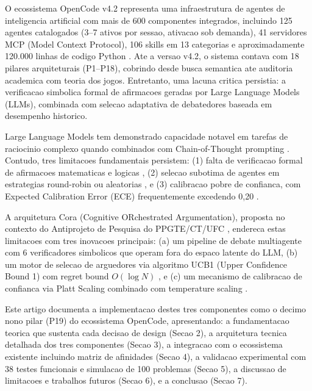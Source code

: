\documentclass[5p]{elsarticle}
\begin{document}
O ecossistema OpenCode v4.2 representa uma infraestrutura de agentes de inteligencia artificial com mais de 600 componentes integrados, incluindo 125 agentes catalogados (3--7 ativos por sessao, ativacao sob demanda), 41 servidores MCP (Model Context Protocol), 106 skills em 13 categorias e aproximadamente 120.000 linhas de codigo Python \cite{opencode2026}. Ate a versao v4.2, o sistema contava com 18 pilares arquiteturais (P1--P18), cobrindo desde busca semantica ate auditoria academica com teoria dos jogos. Entretanto, uma lacuna critica persistia: a verificacao simbolica formal de afirmacoes geradas por Large Language Models (LLMs), combinada com selecao adaptativa de debatedores baseada em desempenho historico.

Large Language Models tem demonstrado capacidade notavel em tarefas de raciocinio complexo quando combinados com Chain-of-Thought prompting \cite{wei2022}. Contudo, tres limitacoes fundamentais persistem: (1) falta de verificacao formal de afirmacoes matematicas e logicas \cite{valmeekam2023}, (2) selecao subotima de agentes em estrategias round-robin ou aleatorias \cite{wu2023}, e (3) calibracao pobre de confianca, com Expected Calibration Error (ECE) frequentemente excedendo 0,20 \cite{guo2017}.

A arquitetura Cora (Cognitive ORchestrated Argumentation), proposta no contexto do Antiprojeto de Pesquisa do PPGTE/CT/UFC \cite{cora2026}, endereca estas limitacoes com tres inovacoes principais: (a) um pipeline de debate multiagente com 6 verificadores simbolicos que operam fora do espaco latente do LLM, (b) um motor de selecao de arguedores via algoritmo UCB1 (Upper Confidence Bound 1) com regret bound $O(\log N)$ \cite{auer2002}, e (c) um mecanismo de calibracao de confianca via Platt Scaling \cite{platt1999} combinado com temperature scaling \cite{guo2017}.

Este artigo documenta a implementacao destes tres componentes como o decimo nono pilar (P19) do ecossistema OpenCode, apresentando: a fundamentacao teorica que sustenta cada decisao de design (Secao 2), a arquitetura tecnica detalhada dos tres componentes (Secao 3), a integracao com o ecossistema existente incluindo matriz de afinidades (Secao 4), a validacao experimental com 38 testes funcionais e simulacao de 100 problemas (Secao 5), a discussao de limitacoes e trabalhos futuros (Secao 6), e a conclusao (Secao 7).

\end{document}
